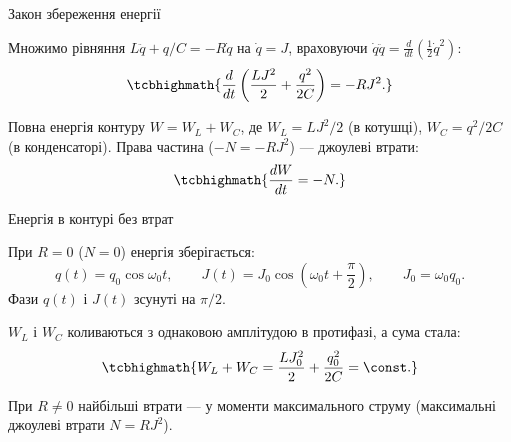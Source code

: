\documentclass[onlytextwidth]{beamer}
\begin{document}
\begin{frame}{Закон збереження енергії}{}
	\begin{block}{}\justifying
		Множимо рівняння $L\ddot q + q/C = -R\dot q$ на $\dot q = J$, враховуючи $\dot q\ddot q = \frac{d}{dt}\left(\tfrac12\dot q^2\right)$:
		\begin{equation*}
			\tcbhighmath{
				\frac{d}{dt}\left(\frac{LJ^2}{2} + \frac{q^2}{2C}\right) = -RJ^2.
			}
		\end{equation*}
	\end{block}
	\begin{block}{}\justifying
		Повна енергія контуру $W = W_L + W_C$, де $W_L = LJ^2/2$ (в котушці), $W_C = q^2/2C$ (в конденсаторі). Права частина ($-N=-RJ^2$) --- джоулеві втрати:
		\begin{equation*}
			\tcbhighmath{
				\frac{dW}{dt} = -N.
			}
		\end{equation*}
	\end{block}
\end{frame}

\begin{frame}{Енергія в контурі без втрат}{}
	\begin{block}{}\justifying
		При $R=0$ ($N=0$) енергія зберігається:
		\begin{equation*}
			q(t) = q_0\cos\omega_0 t, \qquad J(t) = J_0\cos\!\left(\omega_0 t + \frac\pi2\right), \qquad J_0=\omega_0 q_0.
		\end{equation*}
		Фази $q(t)$ і $J(t)$ зсунуті на $\pi/2$.
	\end{block}
	\begin{block}{}\justifying
		$W_L$ і $W_C$ коливаються з однаковою амплітудою в \alert{протифазі}, а сума стала:
		\begin{equation*}
			\tcbhighmath{
				W_L + W_C = \frac{LJ_0^2}{2} + \frac{q_0^2}{2C} = \const.
			}
		\end{equation*}
	\end{block}
	\begin{exampleblock}{}\justifying\small
		При $R\ne0$ найбільші втрати --- у моменти максимального струму (максимальні джоулеві втрати $N=RJ^2$).
	\end{exampleblock}
\end{frame}
\end{document}
